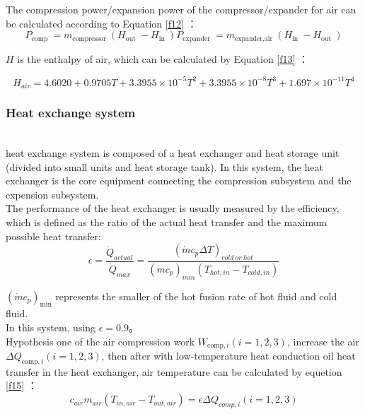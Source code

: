 \documentclass[journal,onecolumn]{IEEEtran}
\begin{document}
The compression power/expansion power of the compressor/expander for air can be calculated according to Equation \ref{f12} ：
\begin{equation}\label{f12}
	P_{\text {comp }}=m_{\text {compressor }}\left(H_{\text {out }}-H_{\text {in }}\right) P_{\text {expander }}=m_{\text {expander,air }}\left(H_{\text {in }}-H_{\text {out }}\right)
\end{equation}

$ H $ is the enthalpy of air, which can be calculated by Equation \ref{f13} ：

\begin{equation}\label{f13}
	H_{a i r}=4.6020+0.9705 T+3.3955 \times 10^{-5} T^{2}+3.3955 \times 10^{-8} T^{3}+1.697 \times 10^{-11} T^{4}
\end{equation}



\subsubsection{Heat exchange system}\ \\

 heat exchange system is composed of a heat exchanger and heat storage unit (divided into small units and heat storage tank). In this system, the heat exchanger is the core equipment connecting the compression subsystem and the expension subsystem. \\

The performance of the heat exchanger is usually measured by the efficiency, which is defined as the ratio of the actual heat transfer and the maximum possible heat transfer:\\

\begin{equation}\label{f14}
	\epsilon=\frac{\dot{Q}_{actual}}{\dot{Q}_{max}}=\frac{(\dot{m}c_p\Delta T)_{cold \  or \  hot}}{(\dot{m}c_p)_{min}(T_{hot,in}-T_{cold,in})}
\end{equation}

$ \left(\dot{m}{c_{p}}\right)_{\min } $ represents the smaller of the hot fusion rate of hot fluid and cold fluid.\\

In this system, using $ \epsilon=0.9 $。\\

Hypothesis one of the air compression work $ W_{\text {comp},i}(i=1,2,3) $, increase the air $ \Delta Q_{\text {comp}, i}(i=1,2,3) $, then after with low-temperature heat conduction oil heat transfer in the heat exchanger, air temperature can be calculated by equetion \ref{f15} ：
\begin{equation}\label{f15}
	c_{a i r} m_{a i r}\left(T_{i n, a i r}-T_{o u t, a i r}\right)=\epsilon \Delta Q_{c o m p, i}(i=1,2,3)
\end{equation}
\end{document}
